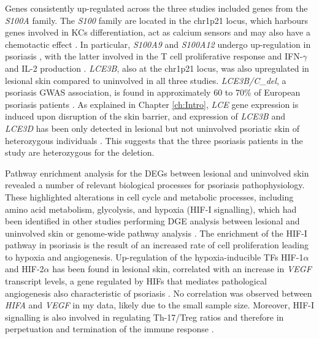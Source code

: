 Genes consistently up-regulated across the three studies included genes from the \textit{S100A} family. The \textit{S100} family are located in the chr1p21 locus, which harbours genes involved in KCs differentiation, act as calcium sensors and may also have a chemotactic effect \parencite{Eckert2004}. In particular, \textit{S100A9} and \textit{S100A12} undergo up-regulation in psoriasis \parencite{Broome2003}, with the latter involved in the T cell proliferative response and IFN-$\gamma$ and IL-2 production \parencite{Moser2007}.  \textit{LCE3B}, also at the chr1p21 locus, was also upregulated in lesional skin compared to uninvolved in all three studies. \textit{LCE3B/C}\_\textit{del}, a psoriasis GWAS association, is found in approximately 60 to 70\% of European psoriasis patients \parencite{Cid2009}. As explained in Chapter \ref{ch:Intro}, \textit{LCE} gene expression is induced upon disruption of the skin barrier, and expression of \textit{LCE3B} and \textit{LCE3D} has been only detected in lesional but not uninvolved psoriatic skin of heterozygous individuals \parencite{Cid2009,Bergboer2011}. This suggests that the three psoriasis patients in the study are heterozygous for the deletion.


Pathway enrichment analysis for the DEGs between lesional and uninvolved skin revealed a number of relevant biological processes for psoriasis pathophysiology. These highlighted alterations in cell cycle and metabolic processes, including amino acid metabolism, glycolysis, and hypoxia (HIF-I signalling), which had been identified in other studies performing DGE analysis between lesional and uninvolved skin or genome-wide pathway analysis \parencite{Coda2012, Gudjonsson2010,Aterido2016, Tervaniemi2016}. The enrichment of the HIF-I pathway in psoriasis is the result of an increased rate of cell proliferation leading to hypoxia and angiogenesis.  Up-regulation of the hypoxia-inducible TFs HIF-1$\alpha$ and HIF-2$\alpha$ has been found in lesional skin, correlated with an increase in \textit{VEGF} transcript levels, a gene regulated by HIFs that mediates pathological angiogenesis also characteristic of psoriasis \parencite{Rosenberg2007}. No correlation was observed between \textit{HIFA} and \textit{VEGF} in my data, likely due to the small sample size. Moreover, HIF-I signalling is also involved in regulating Th-17/Treg ratios and therefore in perpetuation and termination of the immune response \parencite{Dang2013}. 

